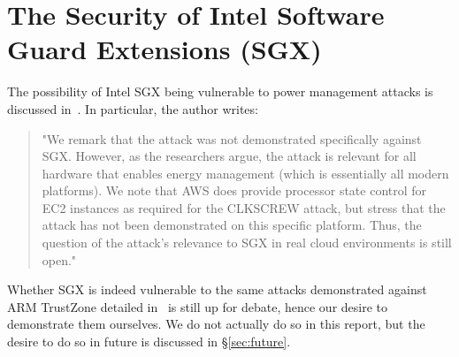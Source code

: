 \section{The Security of Intel Software Guard Extensions (SGX)}

The possibility of Intel SGX being vulnerable to power management attacks is
discussed in~\cite{securityOfSGX}. In particular, the author writes:

\begin{quotation}
    "We remark that the \clkscrew{} attack was not demonstrated specifically
    against SGX. However, as the researchers argue, the attack is relevant for
    all hardware that enables energy management (which is essentially all modern
    platforms). We note that AWS does provide processor state control for EC2
    instances as required for the CLKSCREW attack, but stress that the attack
    has not been demonstrated on this specific platform. Thus, the question of
    the attack’s relevance to SGX in real cloud environments is still open."
\end{quotation}

Whether SGX is indeed vulnerable to the same attacks demonstrated against ARM
TrustZone detailed in~\cite{clkscrew} is still up for debate, hence our desire
to demonstrate them ourselves. We do not actually do so in this report, but the
desire to do so in future is discussed in §\ref{sec:future}.
